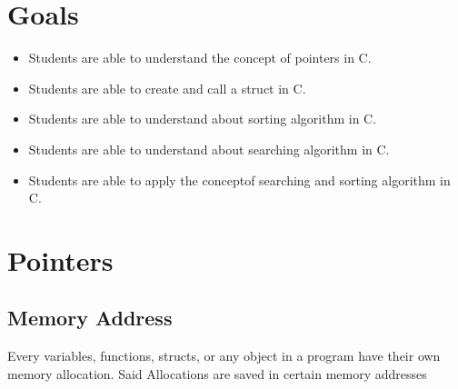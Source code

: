 \section{Goals}
\begin{itemize}[label=$\bullet$, itemsep=-1pt, leftmargin=*]   
    \item Students are able to understand the concept of pointers in C.
    \item Students are able to create and call a struct in C.
    \item Students are able to understand about sorting algorithm in C.
    \item Students are able to understand about searching algorithm in C.
    \item Students are able to apply the conceptof searching and sorting algorithm in C.
\end{itemize}

\section{Pointers}
\subsection{Memory Address}
Every variables, functions, structs, or any object in a program have their own memory allocation. 
Said Allocations are saved in certain memory addresses

